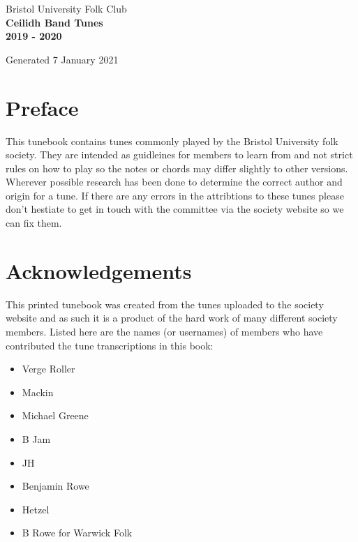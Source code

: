 \documentclass[12pt,a4paper,twoside]{article}
\makeatletter
\newcommand{\thetitle}{Ceilidh Band Tunes \\ \vspace{0.65cm} 2019 - 2020}
\newcommand{\thedate}{7 January 2021}
\renewcommand\tableofcontents{%
    \begin{multicols}{2}[
      \centering
      \section*{\large\contentsname
        \@mkboth{%
           \MakeUppercase\contentsname}{\MakeUppercase\contentsname}}]
    \@starttoc{toc}%
    \end{multicols}
}
\makeatother
\begin{document}
\begin{titlepage}
   \begin{center}
       \large Bristol University Folk Club \\

       \vspace{4cm}
       \textbf{\Huge \thetitle}

       \vspace{0.5cm}
       Generated \thedate

       \vspace{1.5cm}

       \vfill

   \end{center}
\end{titlepage}

\tableofcontents

\section{Preface}

This tunebook contains tunes commonly played by the Bristol University folk society. They are intended as guidleines for members to learn from and not strict rules on how to play so the notes or chords may differ slightly to other versions.
Wherever possible research has been done to determine the correct author and origin for a tune. If there are any errors in the attribtions to these tunes please don't hestiate to get in touch with the committee via the society website so we can fix them.

\section{Acknowledgements}

This printed tunebook was created from the tunes uploaded to the society website and as such it is a product of the hard work of many different society members. Listed here are the names (or usernames) of members who have contributed the tune transcriptions in this book:

\begin{multicols}{2}
\begin{itemize}\item Verge Roller
\item Mackin
\item Michael Greene
\item B Jam
\item JH
\item Benjamin Rowe
\item Hetzel
\item B Rowe for Warwick Folk
\end{itemize}

\end{multicols}
\end{document}
